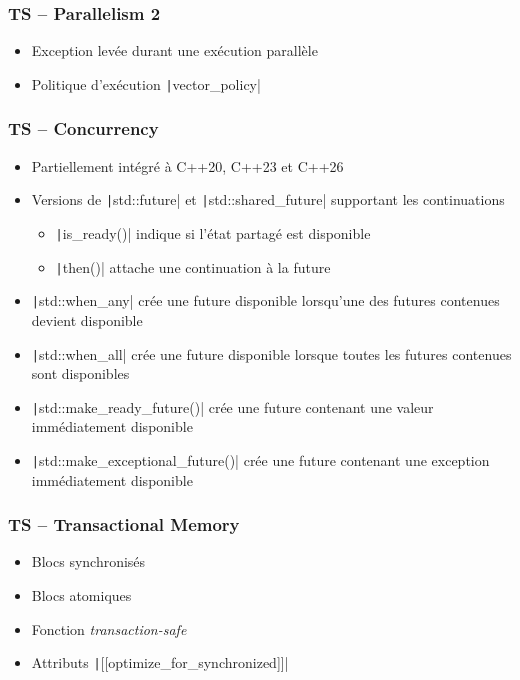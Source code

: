 \documentclass[C++.tex]{subfiles}
\begin{document}
\begin{frame}[fragile]
	\frametitle{TS -- Parallelism 2}
	\begin{itemize}
		\item Exception levée durant une exécution parallèle
		\item Politique d'exécution \texttt|vector_policy|
	\end{itemize}

\end{frame}

\begin{frame}[fragile]
	\frametitle{TS -- Concurrency}
	\begin{itemize}
		\item Partiellement intégré à C++20, C++23 et C++26
		\item Versions de \texttt|std::future| et \texttt|std::shared_future| supportant les continuations
		\begin{itemize}
			\item \texttt|is_ready()| indique si l'état partagé est disponible
			\item \texttt|then()| attache une continuation à la future
		\end{itemize}
		\item \texttt|std::when_any| crée une future disponible lorsqu'une des futures contenues devient disponible
		\item \texttt|std::when_all| crée une future disponible lorsque toutes les futures contenues sont disponibles
		\item \texttt|std::make_ready_future()| crée une future contenant une valeur immédiatement disponible
		\item \texttt|std::make_exceptional_future()| crée une future contenant une exception immédiatement disponible
	\end{itemize}

\end{frame}

\begin{frame}[fragile]
	\frametitle{TS -- Transactional Memory}
	\begin{itemize}
		\item Blocs synchronisés
		\item Blocs atomiques
		\item Fonction \textit{transaction-safe}
		\item Attributs \texttt|[[optimize_for_synchronized]]|
	\end{itemize}

\end{frame}
\end{document}
